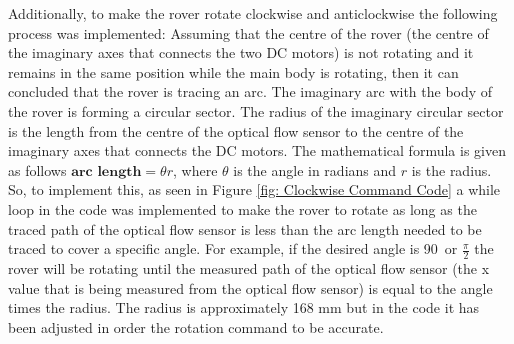 \documentclass[a4paper]{article}
\begin{document}
Additionally, to make the rover rotate clockwise and anticlockwise the 
following process was implemented: Assuming that the centre of the rover 
(the centre of the imaginary axes that connects the two DC motors) is not 
rotating and it remains in the same position while the main body is rotating, 
then it can concluded that the rover is tracing an arc. The imaginary arc with 
the body of the rover is forming a circular sector. The radius of the imaginary 
circular sector is the length from the centre of the optical flow sensor to the 
centre of the imaginary axes that connects the DC motors. The mathematical 
formula is given as follows  \( \textbf{arc length}= \theta r \), where  \(\theta\)   is 
the angle in radians and \(r\) is the radius. So, to implement this, as seen in Figure \ref{fig: Clockwise Command Code} a while loop 
in the code was implemented to make the rover to rotate as long as the traced 
path of the optical flow sensor is less than the arc length needed to be traced 
to cover a specific angle. For example, if the desired angle is 90\degree \   
or  \( \frac{ \pi }{2} \)  the rover will be rotating until the measured path 
of the optical flow sensor (the x value that is being measured from the optical 
flow sensor) is equal to the angle times the radius. The radius is approximately 
168 mm but in the code it has been adjusted in order the rotation command to be 
accurate.

\end{document}

